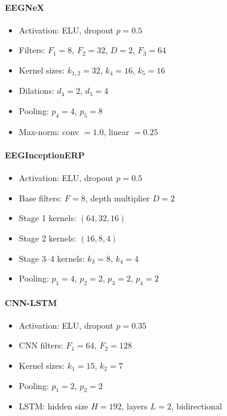 \paragraph{EEGNeX}
\begin{itemize}
    \item Activation: ELU, dropout $p=0.5$
    \item Filters: $F_1=8$, $F_2=32$, $D=2$, $F_3=64$
    \item Kernel sizes: $k_{1,2}=32$, $k_4=16$, $k_5=16$
    \item Dilations: $d_4=2$, $d_5=4$
    \item Pooling: $p_4=4$, $p_5=8$
    \item Max-norm: conv $=1.0$, linear $=0.25$
\end{itemize}

\paragraph{EEGInceptionERP}
\begin{itemize}
    \item Activation: ELU, dropout $p=0.5$
    \item Base filters: $F=8$, depth multiplier $D=2$
    \item Stage 1 kernels: $(64, 32, 16)$
    \item Stage 2 kernels: $(16, 8, 4)$
    \item Stage 3--4 kernels: $k_3=8$, $k_4=4$
    \item Pooling: $p_1=4$, $p_2=2$, $p_3=2$, $p_4=2$
\end{itemize}

\paragraph{CNN-LSTM}
\begin{itemize}
    \item Activation: ELU, dropout $p=0.35$
    \item CNN filters: $F_1=64$, $F_2=128$
    \item Kernel sizes: $k_1=15$, $k_2=7$
    \item Pooling: $p_1=2$, $p_2=2$
    \item LSTM: hidden size $H=192$, layers $L=2$, bidirectional
\end{itemize}

